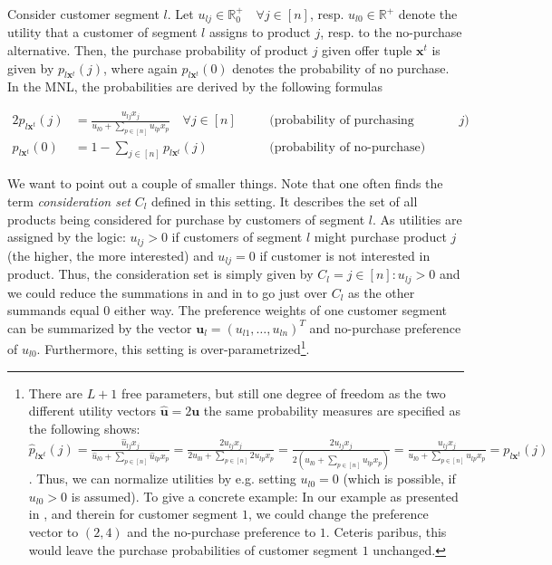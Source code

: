 Consider customer segment $l$. Let $u_{lj} \in \mathbb{R}^+_0 \quad \forall j \in [n]$, resp. $u_{l0} \in \mathbb{R}^+$ denote the utility that a customer of segment $l$ assigns to product $j$, resp. to the no-purchase alternative. Then, the purchase probability of product $j$ given offer tuple $\boldsymbol{x}^t$ is given by $p_{l\boldsymbol{x}^t}(j)$, where again $p_{l\boldsymbol{x}^t}(0)$ denotes the probability of no purchase. In the MNL, the probabilities are derived by the following formulas

\begin{alignat}{2}
	p_{l\boldsymbol{x}^t}(j) &= \frac{u_{lj}x_j}{u_{l0} + \sum_{p\in[n]} u_{lp}x_p} \quad \forall j \in [n]\quad  && \text{(probability of purchasing product $j$)}\label{eq:DCM1}\\
	p_{l\boldsymbol{x}^t}(0) &= 1 - \sum_{j\in[n]}p_{l\boldsymbol{x}^t}(j) && \text{(probability of no-purchase)}\label{eq:DCM2}
\end{alignat} 

We want to point out a couple of smaller things. Note that one often finds the term \emph{consideration set} $C_l$ defined in this setting. It describes the set of all products being considered for purchase by customers of segment $l$. As utilities are assigned by the logic:  $u_{lj} > 0$ if customers of segment $l$ might purchase product $j$ (the higher, the more interested) and $u_{lj} = 0$ if customer is not interested in product. Thus, the consideration set is simply given by $C_l = {j \in [n] : u_{lj} > 0}$ and we could reduce the summations in  and in  to go just over $C_l$ as the other summands equal $0$ either way. 
The preference weights of one customer segment can be summarized by the vector $\boldsymbol{u}_l = (u_{l1}, \dots, u_{ln})^T$ and no-purchase preference of $u_{l0}$. Furthermore, this setting is over-parametrized\footnote{There are $L+1$ free parameters, but still one degree of freedom as the two different utility vectors $\hat{\boldsymbol{u}} = 2\boldsymbol{u}$ the same probability measures are specified as the following shows: $\hat{p}_{l\boldsymbol{x}^t}(j) = \frac{\hat{u}_{lj}x_j}{\hat{u}_{l0} + \sum_{p\in[n]} \hat{u}_{lp}x_p} = \frac{2u_{lj}x_j}{2u_{l0} + \sum_{p\in[n]} 2u_{lp}x_p} = \frac{2u_{lj}x_j}{2\left(u_{l0} + \sum_{p\in[n]} u_{lp}x_p\right)} = \frac{u_{lj}x_j}{u_{l0} + \sum_{p\in[n]} u_{lp}x_p} =  p_{l\boldsymbol{x}^t}(j)$ . Thus, we can normalize utilities by e.g. setting $u_{l0} = 0$ (which is possible, if $u_{l0} > 0$ is assumed). To give a concrete example: In our example as presented in , and therein for customer segment $1$, we could change the preference vector to $(2, 4)$ and the no-purchase preference to $1$. Ceteris paribus, this would leave the purchase probabilities of customer segment $1$ unchanged.}.

